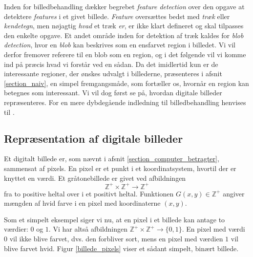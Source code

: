 {
{\sffamily Inden for billedbehandling dækker begrebet \emph{feature
detection} over den opgave at detektere \emph{features} i et givet
billede.  \emph{Feature} oversættes bedst med \emph{træk} eller
\emph{kendetegn}, men nøjagtig \emph{hvad} et træk \emph{er}, er ikke
klart defineret og skal tilpasses den enkelte
opgave\cite{SIOlsen,WikiFeatureDetection}. Et andet område inden
for detektion af træk kaldes for \emph{blob detection}, hvor en
\emph{blob} kan beskrives som en ensfarvet region i billedet. Vi
vil derfor fremover referere til en blob som en region, og i det
følgende vil vi komme ind på præcis hvad vi forstår ved en sådan. Da det
imidlertid kun er de interessante regioner, der ønskes udvalgt i
billederne, præsenteres i afsnit \ref{section_naiv}, en simpel
fremgangsmåde, som fortæller os, hvornår en region kan betegnes som
interessant. Vi vil dog først se på, hvordan digitale billeder
repræsenteres. For en mere dybdegående indledning til billedbehandling
henvises til \cite{SIOlsen}.
}

\subsection{Repræsentation af digitale billeder}
Et digitalt billede er, som nævnt i afsnit
\ref{section_computer_betragter}, sammensat af pixels. En pixel er et punkt i et
koordinatsystem, hvortil der er knyttet en værdi. Et gråtonebillede er
givet ved afbildningen
\begin{equation}
    \mathbb{Z}^{+}\times{} \mathbb{Z}^{+} \rightarrow \mathbb{Z}^{+}
\end{equation}
fra to positive heltal over i et positivt heltal.  Funktionen $G(x, y)
\in \mathbb{Z}^{+}$ angiver mængden af hvid farve i en pixel med
koordinaterne $(x, y)$.

Som et simpelt eksempel siger vi nu, at en pixel i et billede kan antage
to værdier: $0$ og $1$. Vi har altså afbildningen $\mathbb{Z}^{+}\times{}
\mathbb{Z}^{+} \rightarrow \{0, 1\}$. En pixel med værdi $0$ vil ikke
blive farvet, dvs. den forbliver sort, mens en pixel med værdien $1$ vil
blive farvet hvid.  Figur \ref{billede_pixels} viser et sådant simpelt,
binært billede.

}
